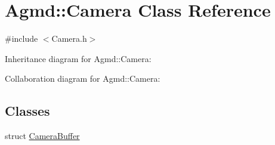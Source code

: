 \hypertarget{class_agmd_1_1_camera}{\section{Agmd\+:\+:Camera Class Reference}
\label{class_agmd_1_1_camera}
}


{\ttfamily \#include $<$Camera.\+h$>$}



Inheritance diagram for Agmd\+:\+:Camera\+:


Collaboration diagram for Agmd\+:\+:Camera\+:
\subsection*{Classes}
\begin{DoxyCompactItemize}
\item 
struct \hyperlink{struct_agmd_1_1_camera_1_1_camera_buffer}{Camera\+Buffer}
\end{DoxyCompactItemize}
